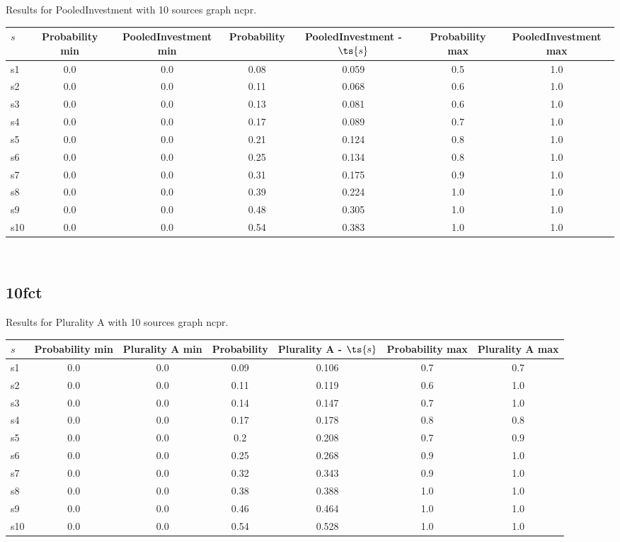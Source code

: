 \documentclass{article}
\begin{document}
\noindent Results for PooledInvestment with 10 sources graph ncpr.

\noindent\begin{tabular}{|l|c|c|c|c|c|c|}
\hline
$s$& Probability min & PooledInvestment min & Probability & PooledInvestment - $\ts{s}$ & Probability max & PooledInvestment max\\
\hline
s1 &0.0 & 0.0 & 0.08 & 0.059 & 0.5 & 1.0\\
\hline
s2 &0.0 & 0.0 & 0.11 & 0.068 & 0.6 & 1.0\\
\hline
s3 &0.0 & 0.0 & 0.13 & 0.081 & 0.6 & 1.0\\
\hline
s4 &0.0 & 0.0 & 0.17 & 0.089 & 0.7 & 1.0\\
\hline
s5 &0.0 & 0.0 & 0.21 & 0.124 & 0.8 & 1.0\\
\hline
s6 &0.0 & 0.0 & 0.25 & 0.134 & 0.8 & 1.0\\
\hline
s7 &0.0 & 0.0 & 0.31 & 0.175 & 0.9 & 1.0\\
\hline
s8 &0.0 & 0.0 & 0.39 & 0.224 & 1.0 & 1.0\\
\hline
s9 &0.0 & 0.0 & 0.48 & 0.305 & 1.0 & 1.0\\
\hline
s10 &0.0 & 0.0 & 0.54 & 0.383 & 1.0 & 1.0\\
\hline
\end{tabular}\\

\newpage

\subsection{10fct}

\noindent Results for Plurality A with 10 sources graph ncpr.

\noindent\begin{tabular}{|l|c|c|c|c|c|c|}
\hline
$s$& Probability min & Plurality A min & Probability & Plurality A - $\ts{s}$ & Probability max & Plurality A max\\
\hline
s1 &0.0 & 0.0 & 0.09 & 0.106 & 0.7 & 0.7\\
\hline
s2 &0.0 & 0.0 & 0.11 & 0.119 & 0.6 & 1.0\\
\hline
s3 &0.0 & 0.0 & 0.14 & 0.147 & 0.7 & 1.0\\
\hline
s4 &0.0 & 0.0 & 0.17 & 0.178 & 0.8 & 0.8\\
\hline
s5 &0.0 & 0.0 & 0.2 & 0.208 & 0.7 & 0.9\\
\hline
s6 &0.0 & 0.0 & 0.25 & 0.268 & 0.9 & 1.0\\
\hline
s7 &0.0 & 0.0 & 0.32 & 0.343 & 0.9 & 1.0\\
\hline
s8 &0.0 & 0.0 & 0.38 & 0.388 & 1.0 & 1.0\\
\hline
s9 &0.0 & 0.0 & 0.46 & 0.464 & 1.0 & 1.0\\
\hline
s10 &0.0 & 0.0 & 0.54 & 0.528 & 1.0 & 1.0\\
\hline
\end{tabular}\\
\end{document}
